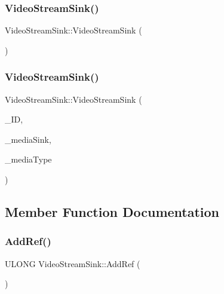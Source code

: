 \subsubsection{\texorpdfstring{Video\+Stream\+Sink()}{VideoStreamSink()}\hspace{0.1cm}{\footnotesize\ttfamily [1/2]}}
{\footnotesize\ttfamily Video\+Stream\+Sink\+::\+Video\+Stream\+Sink (\begin{DoxyParamCaption}{ }\end{DoxyParamCaption})\hspace{0.3cm}{\ttfamily [inline]}}

\mbox{\label{class_video_stream_sink_a7bf6f8b7198889702a8b4edebcce2a2a}} 
\subsubsection{\texorpdfstring{Video\+Stream\+Sink()}{VideoStreamSink()}\hspace{0.1cm}{\footnotesize\ttfamily [2/2]}}
{\footnotesize\ttfamily Video\+Stream\+Sink\+::\+Video\+Stream\+Sink (\begin{DoxyParamCaption}\item[{D\+W\+O\+RD}]{\+\_\+\+ID,  }\item[{I\+M\+F\+Media\+Sink $\ast$}]{\+\_\+media\+Sink,  }\item[{I\+M\+F\+Media\+Type $\ast$}]{\+\_\+media\+Type }\end{DoxyParamCaption})\hspace{0.3cm}{\ttfamily [inline]}}



\subsection{Member Function Documentation}
\mbox{\label{class_video_stream_sink_ae9d980199bb2e8b34d05c5bd1ef90463}} 
\subsubsection{\texorpdfstring{Add\+Ref()}{AddRef()}}
{\footnotesize\ttfamily U\+L\+O\+NG Video\+Stream\+Sink\+::\+Add\+Ref (\begin{DoxyParamCaption}{ }\end{DoxyParamCaption})\hspace{0.3cm}{\ttfamily [override]}}

